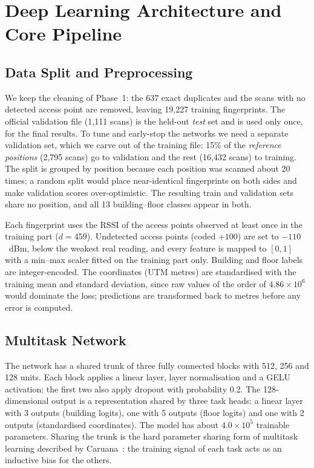 
\section{Deep Learning Architecture and Core Pipeline}
\label{sec:dl_architecture}

\subsection{Data Split and Preprocessing}

We keep the cleaning of Phase~1: the 637 exact duplicates and the scans with no detected access point
are removed, leaving 19{,}227 training fingerprints. The official validation file (1{,}111 scans) is the
held-out \emph{test} set and is used only once, for the final results. To tune and early-stop the
networks we need a separate validation set, which we carve out of the training file: 15\% of the
\emph{reference positions} (2{,}795 scans) go to validation and the rest (16{,}432 scans) to training.
The split is grouped by position because each position was scanned about 20 times; a random split would
place near-identical fingerprints on both sides and make validation scores over-optimistic. The resulting
train and validation sets share no position, and all 13 building--floor classes appear in both.

Each fingerprint uses the RSSI of the access points observed at least once in the training part
($d = 459$). Undetected access points (coded $+100$) are set to $-110$~dBm, below the weakest real reading,
and every feature is mapped to $[0, 1]$ with a min--max scaler fitted on the training part only. Building
and floor labels are integer-encoded. The coordinates (UTM metres) are standardised with the training mean
and standard deviation, since raw values of the order of $4.86\times10^{6}$ would dominate the loss;
predictions are transformed back to metres before any error is computed.

\subsection{Multitask Network}

The network has a shared trunk of three fully connected blocks with 512, 256 and 128 units. Each block
applies a linear layer, layer normalisation and a GELU activation; the first two also apply dropout with
probability 0.2. The 128-dimensional output is a representation shared by three task heads: a linear
layer with 3 outputs (building logits), one with 5 outputs (floor logits) and one with 2 outputs
(standardised coordinates). The model has about $4.0\times10^{5}$ trainable parameters. Sharing the trunk
is the hard parameter sharing form of multitask learning described by Caruana~\cite{caruana1997multitask}:
the training signal of each task acts as an inductive bias for the others.

